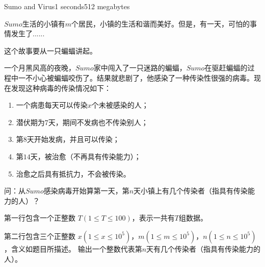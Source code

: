 \documentclass[11pt,a4paper,oneside]{article}
\begin{document}
\begin{problem}{Sumo and Virus}{}{}{1 seconds}{512 megabytes}
		
	
	
	$Sumo$生活的小镇有$m$个居民，小镇的生活和谐而美好。但是，有一天，可怕的事情发生了......
	
	这个故事要从一只蝙蝠讲起。
	
	一个月黑风高的夜晚，$Sumo$家中闯入了一只迷路的蝙蝠，$Sumo$在驱赶蝙蝠的过程中一不小心被蝙蝠咬伤了。结果就悲剧了，他感染了一种传染性很强的病毒。现在发现这种病毒的传染情况如下：
	\begin{enumerate}
		\item 一个病患每天可以传染$x$个未被感染的人；
		\item 潜伏期为$7$天，期间不发病也不传染别人；
		\item 第$8$天开始发病，并且可以传染；
		\item 第$14$天，被治愈（不再具有传染能力）；
		\item 治愈之后具有抵抗力，不会被传染。
	\end{enumerate}

	问：从$Sumo$感染病毒开始算第一天，第$n$天小镇上有几个传染者（指具有传染能力的人）？
	
	\InputFile
	第一行包含一个正整数 $T(1 \leq T \leq 100)$，表示一共有$T$组数据。
	
	第二行包含三个正整数 $x(1 \leq x \leq 10^5)$，$m(1 \leq m \leq 10^5)$，$n(1 \leq n \leq 10^5)$，含义如题目所描述。
	\OutputFile
	输出一个整数代表第$n$天有几个传染者（指具有传染能力的人）。
	\Examples
	\begin{example}
	\end{example}
	
	
	
\end{problem}
\end{document}
